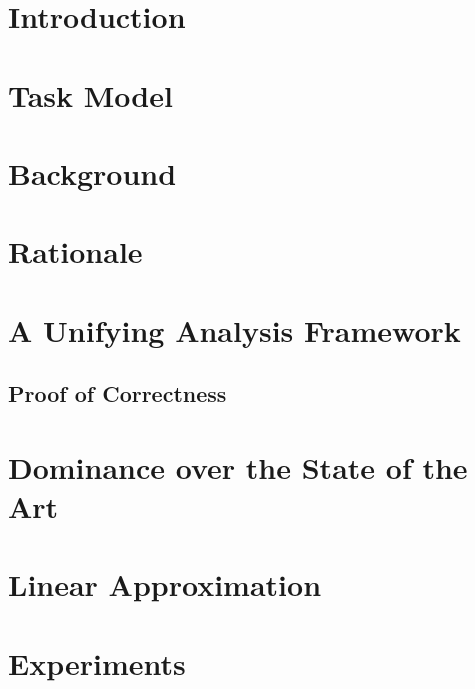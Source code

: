 \documentclass[conference]{IEEEtran}
\begin{document}
\section{Introduction}


\section{Task Model}


\section{Background}
\label{sec:existing-analyses}


\section{Rationale}
\label{sec:rationale}


\section{A Unifying Analysis Framework}
\label{sec:analysis}


\subsection{Proof of Correctness}  
\label{sec:proof-th1}


\section{Dominance over the State of the Art}
\label{sec:dominance}


\section{Linear Approximation}
\label{sec:linear-approximation}










\section{Experiments}
\label{sec:experiments}


\end{document}

